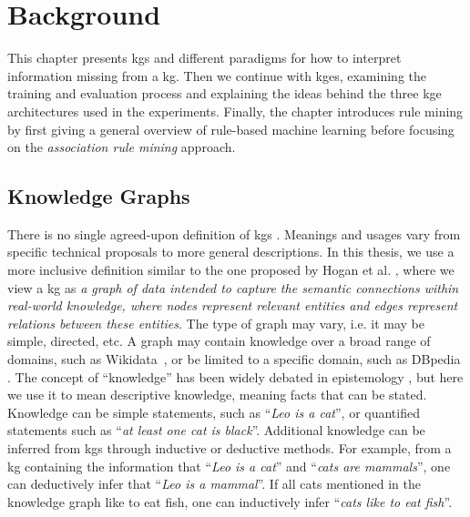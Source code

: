 \chapter{Background}

This chapter presents \glspl{kg} and different paradigms for how to interpret information missing from a \gls{kg}. Then we continue with \glspl{kge}, examining the training and evaluation process and explaining the ideas behind the three \gls{kge} architectures used in the experiments. Finally, the chapter introduces rule mining by first giving a general overview of rule-based machine learning before focusing on the \textit{association rule mining} approach.

\section{Knowledge Graphs}
There is no single agreed-upon definition of \glspl{kg} \cite{bergman_2019, bonatti2019knowledge, ehrlinger2016towards}. Meanings and usages vary from specific technical proposals to more general descriptions. In this thesis, we use a more inclusive definition similar to the one proposed by Hogan et al. \cite{hogan2020knowledge}, where we view a \gls{kg} as \textit{a graph of data intended to capture the semantic connections within real-world knowledge, where nodes represent relevant entities and edges represent relations between these entities}. The type of graph may vary, i.e. it may be simple, directed, etc. A graph may contain knowledge over a broad range of domains, such as Wikidata~\cite{lehmann2015dbpedia}, or be limited to a specific domain, such as DBpedia \cite{fellbaum2010wordnet}. The concept of ``knowledge'' has been widely debated in epistemology \cite{chappell2005plato, kirkham1984does, wittgenstein1969certainty, gottschalk2008internet}, but here we use it to mean descriptive knowledge, meaning facts that can be stated. Knowledge can be simple statements, such as ``\textit{Leo is a cat}'', or quantified statements such as ``\textit{at least one cat is black}''. %
Additional knowledge can be inferred from \glspl{kg} through inductive or deductive methods. For example, from a \gls{kg} containing the information that ``\textit{Leo is a cat}'' and ``\textit{cats are mammals}'', one can deductively infer that ``\textit{Leo is a mammal}''. If all cats mentioned in the knowledge graph like to eat fish, one can inductively infer ``\textit{cats like to eat fish}''.

